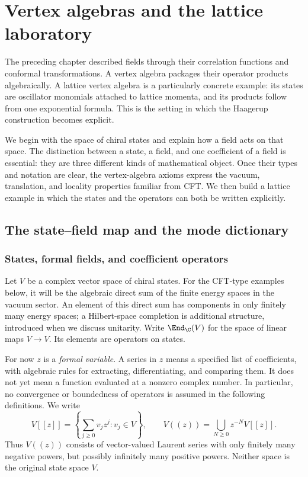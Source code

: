 \chapter{Vertex algebras and the lattice laboratory}
\label{ch:vertex_algebras}

The preceding chapter described fields through their correlation
functions and conformal transformations. A vertex algebra packages
their operator products algebraically. A lattice vertex algebra is a
particularly concrete example: its states are oscillator monomials
attached to lattice momenta, and its products follow from one
exponential formula. This is the setting in which the Haagerup
construction becomes explicit.

We begin with the space of chiral states and explain how a field acts
on that space. The distinction between a state, a field, and one
coefficient of a field is essential: they are three different kinds of
mathematical object. Once their types and notation are clear, the
vertex-algebra axioms express the vacuum, translation, and locality
properties familiar from CFT. We then build a lattice example in which
the states and the operators can both be written explicitly.

\section{The state--field map and the mode dictionary}

\subsection{States, formal fields, and coefficient operators}

Let $V$ be a complex vector space of chiral states. For the CFT-type
examples below, it will be the algebraic direct sum of the finite
energy spaces in the vacuum sector. An element of this direct sum has
components in only finitely many energy spaces; a Hilbert-space completion
is additional structure, introduced when we discuss unitarity.
Write $\End_{\C}(V)$ for the space of linear maps $V\to V$.
Its elements are operators on states.

For now $z$ is a \emph{formal variable}. A series in $z$ means a
specified list of coefficients, with algebraic rules for extracting,
differentiating, and comparing them. It does not yet mean a function
evaluated at a nonzero complex number. In particular, no convergence
or boundedness of operators is assumed in the following definitions.
We write
\[
 V[[z]]=\left\{\sum_{j\geq0}v_jz^j:v_j\in V\right\},
 \qquad V((z))=\bigcup_{N\geq0}z^{-N}V[[z]].
\]
Thus $V((z))$ consists of vector-valued Laurent series with only
finitely many negative powers, but possibly infinitely many positive
powers. Neither space is the original state space $V$.

